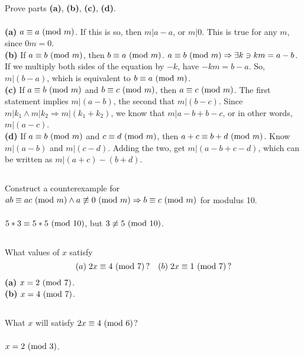 \documentclass{article}
\begin{document}
\subsection{}
Prove parts \textbf{(a)}, \textbf{(b)}, \textbf{(c)}, \textbf{(d)}.\\~\\
\textbf{(a)} $a \equiv a \ (\mathrm{mod}\ m)$.
If this is so, then $m|a - a$, or $m|0$.
This is true for any $m$, since $0m = 0$.\\
\textbf{(b)} If $a \equiv b \ (\mathrm{mod}\ m)$, then $b \equiv a \ (\mathrm{mod}\ m)$.
$a \equiv b \ (\mathrm{mod}\ m) \Rightarrow \exists k \ni km = a - b$.
If we multiply both sides of the equation by $-k$, have $-km = b - a$.
So, $m|(b - a)$, which is equivalent to $b \equiv a \ (\mathrm{mod}\ m)$.\\
\textbf{(c)} If $a \equiv b \ (\mathrm{mod}\ m)$ and $b \equiv c \ (\mathrm{mod}\ m)$,
then $a \equiv c \ (\mathrm{mod}\ m)$.
The first statement implies $m|(a - b)$, the second that $m|(b - c)$.
Since $m|k_1 \land m|k_2 \Rightarrow m|(k_1 + k_2)$,
we know that $m|a - b + b - c$, or in other words, $m|(a - c)$.\\
\textbf{(d)} If $a \equiv b \ (\mathrm{mod}\ m)$ and $c \equiv d \ (\mathrm{mod}\ m)$,
then $a + c \equiv b + d \ (\mathrm{mod}\ m)$.
Know $m|(a - b)$ and $m|(c - d)$.
Adding the two, get $m|(a - b + c - d)$,
which can be written as $m|(a + c) - (b + d)$.

\subsection{}
Construct a counterexample for
$ab \equiv ac \ (\mathrm{mod}\ m) \land a \not\equiv 0 \ (\mathrm{mod}\ m) \Rightarrow b \equiv c \ (\mathrm{mod}\ m)$
for modulus 10.\\~\\
$5 * 3 \equiv 5 * 5 \ (\mathrm{mod}\ 10)$, but $3 \not\equiv 5 \ (\mathrm{mod}\ 10)$.

\subsection{}
What values of $x$ satisfy
\begin{equation*}
    (a)\; 2x \equiv 4 \ (\mathrm{mod}\ 7) \, ? \quad
    (b)\; 2x \equiv 1 \ (\mathrm{mod}\ 7) \, ?
\end{equation*}
\textbf{(a)} $x = 2 \ (\mathrm{mod}\ 7)$.\\
\textbf{(b)} $x = 4 \ (\mathrm{mod}\ 7)$.

\subsection{}
What $x$ will satisfy $2x \equiv 4 \ (\mathrm{mod}\ 6)$?\\~\\
$x = 2 \ (\mathrm{mod}\ 3)$.
\end{document}
